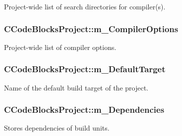 Project-\/wide list of search directories for compiler(s). 

\hypertarget{classCCodeBlocksProject_a2ed56871685ed16b5bda3c4ce2b0f4c3}{
\subsubsection[{m\-\_\-\-Compiler\-Options}]{\setlength{\rightskip}{0pt plus 5cm}C\-Code\-Blocks\-Project\-::m\-\_\-\-Compiler\-Options\hspace{0.3cm}{\ttfamily [private]}}}\label{classCCodeBlocksProject_a2ed56871685ed16b5bda3c4ce2b0f4c3}


Project-\/wide list of compiler options. 

\hypertarget{classCCodeBlocksProject_abab92dc143ab33631209cdd4fde96535}{
\subsubsection[{m\-\_\-\-Default\-Target}]{\setlength{\rightskip}{0pt plus 5cm}C\-Code\-Blocks\-Project\-::m\-\_\-\-Default\-Target\hspace{0.3cm}{\ttfamily [private]}}}\label{classCCodeBlocksProject_abab92dc143ab33631209cdd4fde96535}


Name of the default build target of the project. 

\hypertarget{classCCodeBlocksProject_a060c4ae622786abceb80d462d233922d}{
\subsubsection[{m\-\_\-\-Dependencies}]{\setlength{\rightskip}{0pt plus 5cm}C\-Code\-Blocks\-Project\-::m\-\_\-\-Dependencies\hspace{0.3cm}{\ttfamily [private]}}}\label{classCCodeBlocksProject_a060c4ae622786abceb80d462d233922d}


Stores dependencies of build units. 

